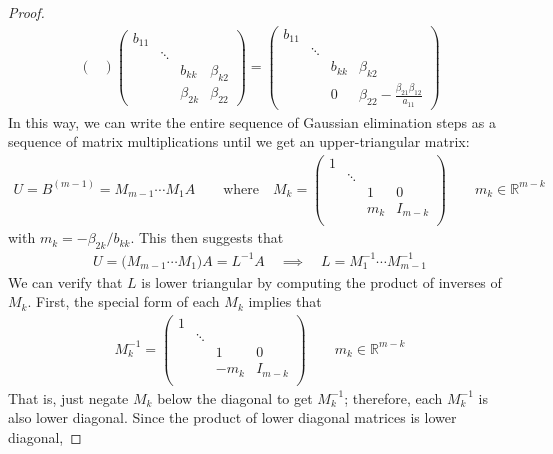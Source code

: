 \documentclass[12pt]{article}
\numberwithin{equation}{section} %
\theoremstyle{plain}
\theoremstyle{definition}
\theoremstyle{remark}
\newcommand{\R}{\mathbb{R}}
\begin{document}
\begin{proof}
\begin{align*}
\begin{pmatrix}
  \end{pmatrix}
  \begin{pmatrix}
    b_{11} & \\
    & \ddots &  & \\
    & & b_{kk} & \beta_{k2} \\
    & & \beta_{2k} & \beta_{22}
  \end{pmatrix}
  =
  \begin{pmatrix}
    b_{11} & \\
    & \ddots &  & \\
    & & b_{kk} & \beta_{k2}  \\
    & & 0 & \beta_{22}
      - \frac{\beta_{21}\beta_{12}}{a_{11}}
  \end{pmatrix}
\end{align*}
In this way, we can write the entire sequence of Gaussian elimination
steps as a sequence of matrix multiplications until we get an
upper-triangular matrix:
\begin{align*}
  U = B^{(m-1)} = M_{m-1}\cdots M_1 A
  \qquad
  \text{where}\quad
  M_k
  =
  \begin{pmatrix}
    1 & &\\
    & \ddots &\\
    & & 1 & 0\\
    & & m_k & I_{m-k} \\
  \end{pmatrix}
  \qquad m_k \in\R^{m-k}
\end{align*}
with $m_k = -\beta_{2k}/b_{kk}$.
This then suggests that
\begin{align*}
  U = \big(M_{m-1}\cdots M_1\big)A
  = L^{-1} A
  \quad\implies\quad
  L = M_1^{-1}\cdots M_{m-1}^{-1}
\end{align*}
We can verify that $L$ is lower triangular by computing the product of
inverses of $M_k$. First, the special form of each $M_k$ implies that
\begin{align*}
  M_k^{-1} =
  \begin{pmatrix}
    1 & &\\
    & \ddots &\\
    & & 1 & 0\\
    & & -m_k &I_{m-k} \\
  \end{pmatrix}
  \qquad m_k \in\R^{m-k}
\end{align*}
That is, just negate $M_k$ below the diagonal to get $M_{k}^{-1}$;
therefore, each $M_k^{-1}$ is also lower diagonal. Since the product of
lower diagonal matrices is lower diagonal,

\end{proof}
\end{document}
